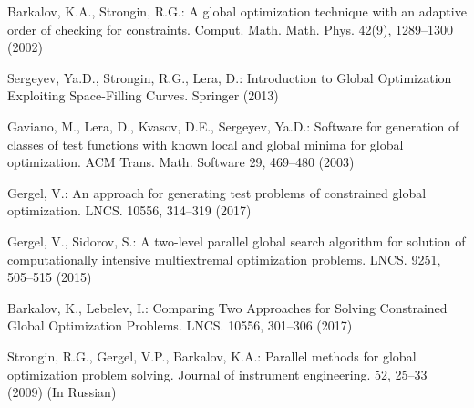 \documentclass[smallextended]{svjour3}       %
\begin{document}
\begin{thebibliography}{}
Barkalov, K.A., Strongin, R.G.: A global optimization technique with an adaptive order of 
checking for constraints. Comput. Math. Math. Phys. 42(9), 1289--1300 (2002)

Sergeyev, Ya.D., Strongin, R.G., Lera, D.: Introduction to Global Optimization Exploiting 
Space-Filling Curves. Springer (2013)

Gaviano, M., Lera, D., Kvasov, D.E., Sergeyev, Ya.D.: Software for generation of classes of 
test functions with known local and global minima for global optimization. ACM Trans. Math. 
Software 29, 469--480 (2003)

Gergel, V.: An approach for generating test problems of constrained global optimization. 
LNCS. 10556, 314--319 (2017)


Gergel, V., Sidorov, S.: A two-level parallel global search algorithm for solution of 
computationally intensive multiextremal optimization problems. LNCS. 9251, 505--515 (2015)

Barkalov, K., Lebelev, I.: Comparing Two Approaches for Solving Constrained Global 
Optimization Problems. LNCS. 10556, 301--306 (2017)

Strongin, R.G., Gergel, V.P., Barkalov, K.A.: Parallel methods for global optimization problem 
solving. Journal of instrument engineering. 52, 25--33 (2009) (In Russian)



%
\end{thebibliography}
\end{document}
